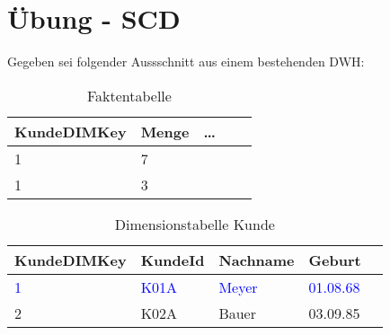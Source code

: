 \section{Übung - SCD}
\label{sec:uebung_04}
Gegeben sei folgender Aussschnitt aus einem bestehenden DWH:

\begin{table}[H]
  \centering
  \ttfamily
  \small
  \begin{tabular}{|l|l|l|l|l|}
    \hline
    \textbf{KundeDIMKey}  & \textbf{Menge} & \textbf{\dots}       \\
    \hline
    1                     & 7              &                      \\
    1                     & 3               &                     \\
    \hline
  \end{tabular}
  \caption{Faktentabelle}
\end{table}

\begin{table}[H]
  \centering
  \ttfamily
  \small
  \begin{tabular}{|l|l|l|l|l|}
    \hline
    \textbf{KundeDIMKey}  & \textbf{KundeId}        & \textbf{Nachname}       & \textbf{Geburt}             \\
    \hline
    \textcolor{blue}{1}   & \textcolor{blue}{K01A}  & \textcolor{blue}{Meyer} & \textcolor{blue}{01.08.68}  \\
    2                     & K02A                    & Bauer                   & 03.09.85                    \\
    \hline
  \end{tabular}
  \caption{Dimensionstabelle Kunde}
\end{table}
